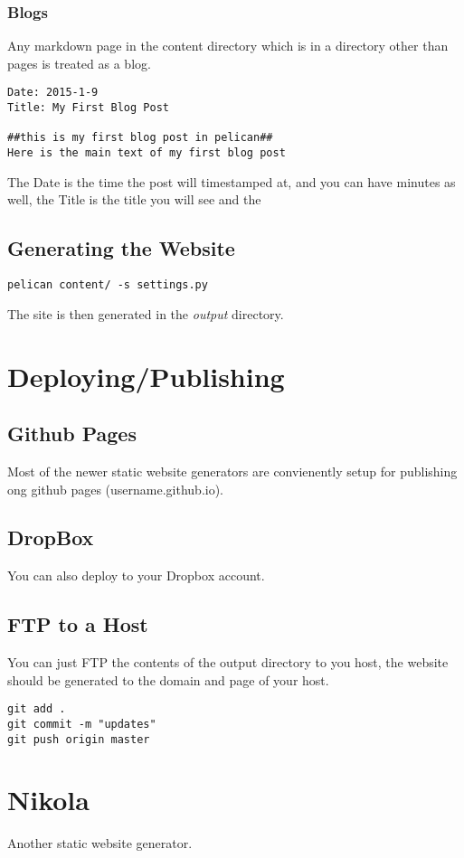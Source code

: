 \documentclass[12pt]{article}			%
\begin{document}
\subsubsection{Blogs}
Any markdown page in the content directory which is in a directory other than pages is treated as a blog.

\begin{verbatim}
Date: 2015-1-9
Title: My First Blog Post

##this is my first blog post in pelican##
Here is the main text of my first blog post

\end{verbatim}
The Date is the time the post will timestamped at, and you can have minutes as well, the Title is the title you will see and the
\subsection{Generating the Website}
\begin{verbatim}
pelican content/ -s settings.py
\end{verbatim}
The site is then generated in the \textit{output} directory.

\newpage
\section{Deploying/Publishing}
\subsection{Github Pages}
Most of the newer static website generators are convienently setup for publishing ong github pages (username.github.io).
\subsection{DropBox}
You can also deploy to your Dropbox account.
\subsection{FTP to a Host}
You can just FTP the contents of the output directory to you host, the website should be generated to the domain and page of your host.

\begin{verbatim}
git add .
git commit -m "updates"
git push origin master
\end{verbatim}

\newpage
\section{Nikola}
Another static website generator.
\end{document}
